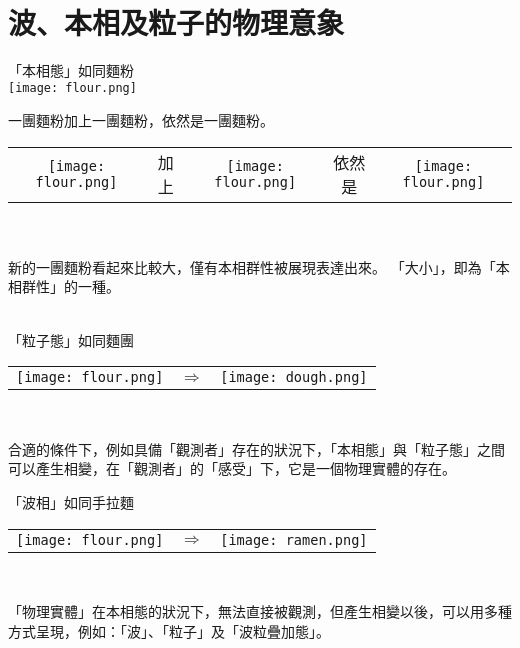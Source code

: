 \documentclass[a4paper,notitlepage,UTF8]{ctexart}
\begin{document}
\\































\section{波、本相及粒子的物理意象}
\begin{center}
「本相態」如同麵粉
\\
\texttt{[image: flour.png]}
\end{center}

一團麵粉加上一團麵粉，依然是一團麵粉。
\\
\begin{tabular}{ccccc}
\texttt{[image: flour.png]}
&
加上
&
\texttt{[image: flour.png]}
&
依然是
&
\texttt{[image: flour.png]}
\end{tabular}
 \\
 \\
新的一團麵粉看起來比較大，僅有本相群性被展現表達出來。
「大小」，即為「本相群性」的一種。
\\
 \\
\begin{center}
「粒子態」如同麵團
\\
\begin{tabular}{ccc}
\texttt{[image: flour.png]}
&
$\Longrightarrow$
&
\texttt{[image: dough.png]}
\end{tabular}
\\
\end{center}
合適的條件下，例如具備「觀測者」存在的狀況下，「本相態」與「粒子態」之間可以產生相變，在「觀測者」的「感受」下，它是一個物理實體的存在。
\begin{center}
「波相」如同手拉麵
\\
\begin{tabular}{ccc}
\texttt{[image: flour.png]}
&
$\Longrightarrow$
&
\texttt{[image: ramen.png]}
\end{tabular}
\\
\end{center}
「物理實體」在本相態的狀況下，無法直接被觀測，但產生相變以後，可以用多種方式呈現，例如：「波」、「粒子」及「波粒疊加態」。
\\
\end{document}
